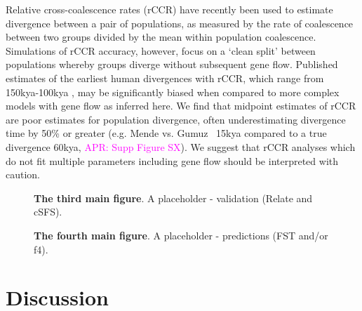 \documentclass[]{article}
\newcommand{\aprcomment}[1]{{\textcolor{magenta}{APR: #1}}}
\begin{document}
Relative cross-coalescence rates (rCCR) have recently been used to estimate
divergence between a pair of populations, as measured by the rate of
coalescence between two groups divided by the mean within population
coalescence. Simulations of rCCR accuracy, however, focus on a ‘clean split’
between populations whereby groups diverge without subsequent gene flow.
Published estimates of the earliest human divergences with rCCR, which range
from 150kya-100kya \citep{Bergstrom2021-iw}, may be significantly biased when
compared to more complex models with gene flow as inferred here. We find that
midpoint estimates of rCCR are poor estimates for population divergence, often
underestimating divergence time by 50\% or greater (e.g. Mende vs. Gumuz ~15kya
compared to a true divergence 60kya, \aprcomment{Supp Figure SX}). We suggest
that rCCR analyses which do not fit multiple parameters including gene flow
should be interpreted with caution.

\begin{figure}[ht]
\begin{center}
    \makebox[\textwidth][c]{} %
\caption{\textbf{The third main figure}.
    A placeholder - validation (Relate and cSFS).
}
\label{fig:3}
\end{center}
\end{figure}

\begin{figure}[ht]
\begin{center}
    \makebox[\textwidth][c]{} %
\caption{\textbf{The fourth main figure}.
    A placeholder - predictions (FST and/or f4).
}
\label{fig:4}
\end{center}
\end{figure}

\section*{Discussion}
\end{document}

